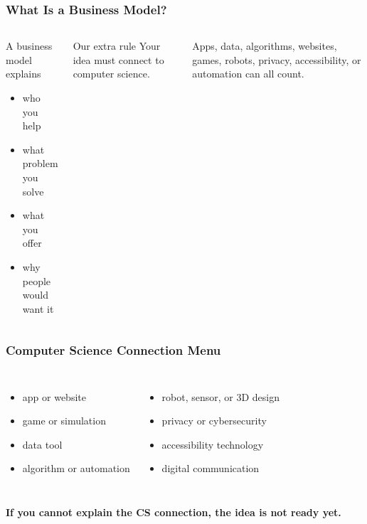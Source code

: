 \documentclass[aspectratio=169]{beamer}
\begin{document}
\begin{frame}[plain]
\frametitle{What Is a Business Model?}
\begin{columns}[T,totalwidth=\textwidth]
\begin{block}{A business model explains}
\begin{itemize}
\large
\item who you help
\item what problem you solve
\item what you offer
\item why people would want it
\end{itemize}
\end{block}
\begin{block}{Our extra rule}
\Large Your idea must connect to computer science.
\end{block}
\vspace{0.15cm}
\large Apps, data, algorithms, websites, games, robots, privacy, accessibility, or automation can all count.
\end{columns}
\end{frame}

\begin{frame}[plain]
\frametitle{Computer Science Connection Menu}
\begin{columns}[T,totalwidth=\textwidth]
\begin{itemize}
\large
\item app or website
\item game or simulation
\item data tool
\item algorithm or automation
\end{itemize}
\begin{itemize}
\large
\item robot, sensor, or 3D design
\item privacy or cybersecurity
\item accessibility technology
\item digital communication
\end{itemize}
\end{columns}
\vspace{0.25cm}
\begin{center}
\Large\bfseries If you cannot explain the CS connection, the idea is not ready yet.
\end{center}
\end{frame}
\end{document}
